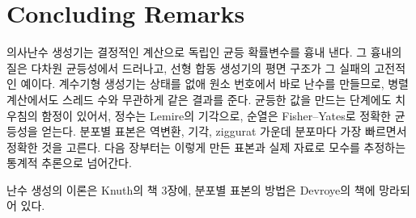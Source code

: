 \section{Concluding Remarks}

의사난수 생성기는 결정적인 계산으로 독립인 균등 확률변수를 흉내 낸다. 그 흉내의 질은 다차원 균등성에서 드러나고, 선형 합동 생성기의 평면 구조가 그 실패의 고전적인 예이다. 계수기형 생성기는 상태를 없애 원소 번호에서 바로 난수를 만들므로, 병렬 계산에서도 스레드 수와 무관하게 같은 결과를 준다. 균등한 값을 만드는 단계에도 치우침의 함정이 있어서, 정수는 Lemire의 기각으로, 순열은 Fisher--Yates로 정확한 균등성을 얻는다. 분포별 표본은 역변환, 기각, ziggurat 가운데 분포마다 가장 빠르면서 정확한 것을 고른다. 다음 장부터는 이렇게 만든 표본과 실제 자료로 모수를 추정하는 통계적 추론으로 넘어간다.

난수 생성의 이론은 Knuth의 책\cite{knuth1997taocp2} 3장에, 분포별 표본의 방법은 Devroye의 책\cite{devroye1986}에 망라되어 있다.

\chapterreferences
